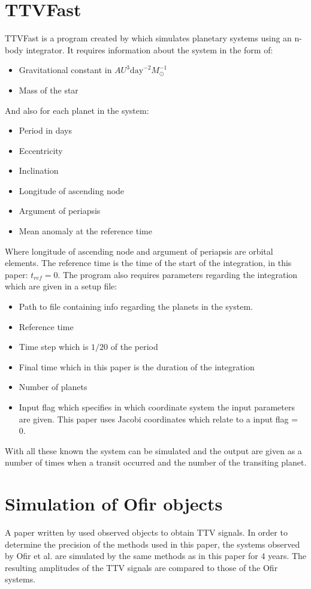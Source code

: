 \documentclass[12pt]{report}
\begin{document}
\section{TTVFast}
\label{TTVFast_method}
	TTVFast is a program created by \cite{2014ApJ...787..132D} which simulates planetary systems using an n-body integrator. It requires information about the system in the form of:
	\begin{itemize}
		\item Gravitational constant in $AU^3 \mathrm{day}^{-2}M_{\odot}^{-1}$
		\item Mass of the star 
	\end{itemize}
	And also for each planet in the system:
	\begin{itemize}
		\item Period in days 
		\item Eccentricity
		\item Inclination 
		\item Longitude of ascending node
		\item Argument of periapsis 
		\item Mean anomaly at the reference time 
	\end{itemize}
	Where longitude of ascending node and argument of periapsis are orbital elements. The reference time is the time of the start of the integration, in this paper: $t_{ref}=0$. The program also requires parameters regarding the integration which are given in a setup file:
	\begin{itemize}
		\item Path to file containing info regarding the planets in the system.
		\item Reference time
		\item Time step which is $1/20$ of the period
		\item Final time which in this paper is the duration of the integration
		\item Number of planets
		\item Input flag which specifies in which coordinate system the input parameters are given. This paper uses Jacobi coordinates which relate to a input flag = 0.
	\end{itemize}
	With all these known the system can be simulated and the output are given as a number of times when a transit occurred and the number of the transiting planet.
\section{Simulation of Ofir objects}
	A paper written by \cite{2018ApJS..234....9O} used observed objects to obtain TTV signals. In order to determine the precision of the methods used in this paper, the systems observed by Ofir et al. are simulated by the same methods as in this paper for 4 years. The resulting amplitudes of the TTV signals are compared to those of the Ofir systems.
\end{document}
